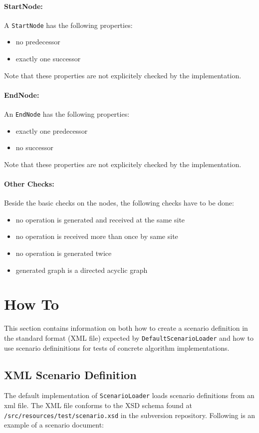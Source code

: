 \documentclass[11pt,a4paper]{article}
\begin{document}
\paragraph{StartNode:}
A \texttt{StartNode} has the following properties:
\begin{itemize}
 \item no predecessor
 \item exactly one successor
\end{itemize}
Note that these properties are not explicitely checked by the implementation.

\paragraph{EndNode:}
An \texttt{EndNode} has the following properties:
\begin{itemize}
 \item exactly one predecessor
 \item no successor
\end{itemize}
Note that these properties are not explicitely checked by the implementation.

\paragraph{Other Checks:}
Beside the basic checks on the nodes, the following checks have to be done:
\begin{itemize}
 \item no operation is generated and received at the same site
 \item no operation is received more than once by same site
 \item no operation is generated twice
 \item generated graph is a directed acyclic graph
\end{itemize}



\section{How To}
This section contains information on both how to create a scenario definition in the standard format (XML file) expected by \texttt{DefaultScenarioLoader} and how to use scenario defininitions for tests of concrete algorithm implementations.

\subsection{XML Scenario Definition}
The default implementation of \texttt{ScenarioLoader} loads scenario definitions from an xml file. The XML file conforms to the XSD schema found at \texttt{/src/resources/test/scenario.xsd} in the subversion repository. Following is an example of a scenario document:
\end{document}
